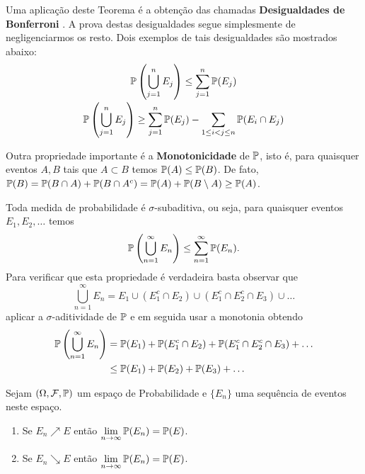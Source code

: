 Uma aplicação deste Teorema é a obtenção das
chamadas {\bf Desigualdades de Bonferroni} .
A prova destas desigualdades segue simplesmente de negligenciarmos 
os resto. Dois exemplos de tais desigualdades são mostrados
abaixo:
\[ 
\begin{array}{c}
	\displaystyle
	\P \left( \bigcup_{j=1}^{n} E_j \right) 
	\leq 
	\sum_{j=1}^n \P(E_j)
	\\[0.5cm]
	\displaystyle
	\P \left( \bigcup_{j=1}^{n} E_j \right) 
	\geq
	\sum_{j=1}^n \P(E_j) - \sum_{1\leq i<j\leq n} \P(E_i\cap E_j)	
\end{array}
\]

Outra propriedade importante é a {\bf Monotonicidade} de $\P$, isto é, 
para quaisquer eventos $A,B$ tais que $A\subset B$ temos 
$\P(A)\leq \P(B)$. De fato, 
$\P(B)=\P(B\cap A)+\P(B\cap A^c)= \P(A)+\P(B\setminus A)\geq \P(A)$.

Toda medida de probabilidade é $\sigma$-subaditiva, ou seja, 
para quaisquer eventos $E_1,E_2,\ldots$ temos 
	\[
		\P\left( \bigcup_{n=1}^{\infty} E_n\right)
		\leq 
		\sum_{n=1}^{\infty} \P(E_n).
	\]
Para verificar que esta propriedade é verdadeira basta observar que 
\[
	\bigcup_{n=1}^{\infty} E_n = E_1 \cup (E_1^c\cap E_2) \cup (E_1^c\cap E_2^c\cap E_3) \cup \ldots
\]
aplicar a $\sigma$-aditividade de $\P$ e em seguida usar a monotonia
obtendo
	\begin{align*}
	\P\left( \bigcup_{n=1}^{\infty} E_n\right)
	&=
	\P(E_1)+\P(E_1^c\cap E_2) + \P(E_1^c\cap E_2^c\cap E_3) +\ldots
	\\
	&\leq
	\P(E_1) + \P(E_2) + \P(E_3) +\ldots
	\end{align*}
	
\begin{teorema}
	Sejam $(\Omega,\F,\P)$ um espaço de Probabilidade e
	$\{E_n\}$ uma sequência de eventos neste espaço.
	\begin{enumerate}
		\item
		Se $E_n\nearrow E$ então 
		$\displaystyle\lim_{n\to\infty}\P(E_n)=\P(E)$.
		\item 
		Se $E_n\searrow E$ então 
		$\displaystyle\lim_{n\to\infty}\P(E_n)=\P(E)$.		
	\end{enumerate}
\end{teorema}


